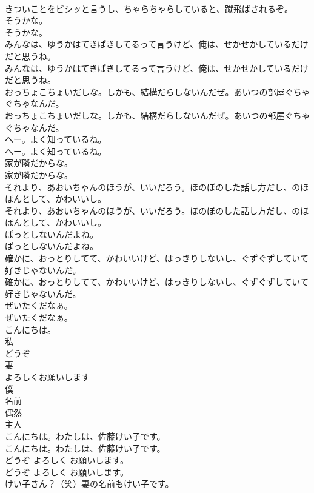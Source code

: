 \documentclass[8pt]{extreport}
\begin{document}
\begin{CJK}{UTF8}{min}
\\	きついことをビシッと言うし、ちゃらちゃらしていると、蹴飛ばされるぞ。 
\\	そうかな。	
\\	そうかな。 
\\	みんなは、ゆうかはてきぱきしてるって言うけど、俺は、せかせかしているだけだと思うね。	
\\	みんなは、ゆうかはてきぱきしてるって言うけど、俺は、せかせかしているだけだと思うね。 
\\	おっちょこちょいだしな。しかも、結構だらしないんだぜ。あいつの部屋ぐちゃぐちゃなんだ。	
\\	おっちょこちょいだしな。しかも、結構だらしないんだぜ。あいつの部屋ぐちゃぐちゃなんだ。 
\\	へー。よく知っているね。	
\\	へー。よく知っているね。 
\\	家が隣だからな。	
\\	家が隣だからな。 
\\	それより、あおいちゃんのほうが、いいだろう。ほのぼのした話し方だし、のほほんとして、かわいいし。	
\\	それより、あおいちゃんのほうが、いいだろう。ほのぼのした話し方だし、のほほんとして、かわいいし。 
\\	ぱっとしないんだよね。	
\\	ぱっとしないんだよね。 
\\	確かに、おっとりしてて、かわいいけど、はっきりしないし、ぐずぐずしていて好きじゃないんだ。	
\\	確かに、おっとりしてて、かわいいけど、はっきりしないし、ぐずぐずしていて好きじゃないんだ。 
\\	ぜいたくだなぁ。	
\\	ぜいたくだなぁ。 
\\	こんにちは。
\\	私
\\	どうぞ
\\	妻
\\	よろしくお願いします
\\	僕
\\	名前
\\	偶然
\\	主人
\\	こんにちは。わたしは、佐藤けい子です。	
\\	こんにちは。わたしは、佐藤けい子です。 
\\	どうぞ よろしく お願いします。	
\\	どうぞ よろしく お願いします。 
\\	けい子さん？（笑）妻の名前もけい子です。	

\end{CJK}
\end{document}
